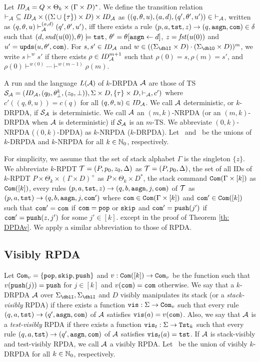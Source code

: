 \noindent
Let $\mathit{ID}_{\cal A}= Q\times \Theta_k\times (\Gamma\times D)^*$.
We define the transition relation $\vdash_{\cal A}\ \subseteq\mathit{ID}_{\cal A}\times ((\Sigma\cup\{\tau\})\times D)\times \mathit{ID}_{\cal A}$ as
$((q,\theta,u), (a,d), (q',\theta',u'))\in\ \vdash_\calA$,
written as $(q,\theta,u)\vdash^{(a,d)}_{{\cal A}}(q',\theta',u')$, iff
there exists a rule $(p, a, \mathtt{tst}, z) \to (q, \mathtt{asgn}, \mathtt{com}) \in \delta$
such that
$(d, \mathit{snd}(u(0)), \theta)\models\mathtt{tst}$, $\theta' = \theta[\mathtt{asgn}\leftarrow d]$,
$z=\mathit{fst}(u(0))$ and
$u'= \mathtt{upds}(u,\theta',\mathtt{com})$.
For $s,s'\in\mathit{ID}_{\cal A}$ and
$w\in((\Sigma_\dblI\times D)\cdot (\Sigma_\dblO\times D))^{m}$,
we write $s\vdash^{w}s'$ if
there exists $\rho\in\mathit{ID}_{\cal A}^{m+1}$ such that
$\rho(0)=s, \rho(m)=s'$, and
$\rho(0)\vdash^{w(0)}\cdots\vdash^{w(m-1)}\rho(m)$.

A run and the language $L({\cal A})$ of $k$-DRPDA ${\cal A}$ are those of TS
${\cal S}_{\cal A}=(\mathit{ID}_{\cal A}, (q_0, \theta^k_\bot, (z_0,\bot)), \Sigma\times D, \{\tau\}\times D, \vdash_{\cal A}, c')$ where
$c'((q,\theta,u))=c(q)$ for all $(q,\theta,u)\in\mathit{ID}_{\cal A}$.
We call ${\cal A}$ deterministic, or $k$-DRPDA, if ${\cal S}_{\cal A}$ is deterministic.
We call ${\cal A}$ an $(m,k)$-NRPDA (or an $(m,k)$-DRPDA when ${\cal A}$ is deterministic)
if ${\cal S}_{\cal A}$ is an $m$-TS.
We abbreviate $(0,k)$-NRPDA ($(0,k)$-DPDA) as $k$-NRPDA ($k$-DRPDA).
Let \DRPDA\ and \NRPDA\ be the unions of $k$-DRPDA and $k$-NRPDA for all $k\in\mathbb{N}_0$, respectively.

\medskip
For simplicity,
we assume that the set of stack alphabet $\Gamma$
is the singleton $\{z\}$.
We abbreviate
$k$-RPDT ${\cal T}=(P, p_0, z_0, \Delta)$ as ${\cal T}=(P, p_0, \Delta)$,
the set of all
IDs of $k$-RPDT $P\times\Theta_k\times(\Gamma\times D)^+$
as $P\times\Theta_k\times D^*$,
the stack command $\mathtt{Com}(\Gamma\times[k])$ as $\mathtt{Com}([k])$,
every rules $(p, a, \mathtt{tst}, z) \to (q, b, \mathtt{asgn}, j, \mathtt{com})$ of ${\cal T}$ as
$(p, a, \mathtt{tst}) \to (q, b, \mathtt{asgn}, j, \mathtt{com}')$ where
$\mathtt{com}\in\mathtt{Com}(\Gamma\times[k])$ and $\mathtt{com}'\in\mathtt{Com}([k])$
such that $\mathtt{com}'=\mathtt{com}$ if $\mathtt{com}=\mathtt{pop}$ or $\mathtt{skip}$ and
$\mathtt{com}'=\mathtt{push}(j')$ if $\mathtt{com}'=\mathtt{push}(z,j')$ for some $j'\in[k]$.
except in the proof of Theorem \ref{th: DPDAv}.
We apply a similar abbreviation to those of RPDA.

\subsection{Visibly RPDA}
Let $\mathtt{Com}_v=\{\mathtt{pop},\mathtt{skip},\mathtt{push}\}$ and $v:\mathtt{Com}([k])\to\mathtt{Com}_v$ be the function such that $v(\mathtt{push}(j))=\mathtt{push}$ for $j\in[k]$ and $v(\mathtt{com})=\mathtt{com}$ otherwise.
We say that a $k$-DRPDA ${\cal A}$
over $\Sigma_\dblI,\Sigma_\dblI$ and $D$
visibly manipulates its stack (or a {\em stack-visibly} RPDA) if
there exists a function $\mathtt{vis}: \Sigma\to\mathtt{Com}_v$
such that
every rule $(q,a,\mathtt{tst})\to(q',\mathtt{asgn},\mathtt{com})$ of ${\cal A}$
satisfies $\mathtt{vis}(a)=v(\mathtt{com})$.
Also, we say that ${\cal A}$ is a {\em test-visibly} RPDA if
there exists a function $\mathtt{vis}_t: \Sigma\to\mathtt{Tst}_k$
such that
every rule $(q,a,\mathtt{tst})\to(q',\mathtt{asgn},\mathtt{com})$ of ${\cal A}$
satisfies $\mathtt{vis}_t(a)=\mathtt{tst}$.
If ${\cal A}$ is stack-visibly and test-visibly RPDA,
we call ${\cal A}$ a visibly RPDA.
Let \DRPDAv\ be the union of visibly $k$-DRPDA for all $k\in\mathbb{N}_0$, respectively.

